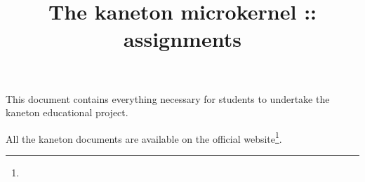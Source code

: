 %
%
%
%
%
%

%
%

%
%

\def\path{../..}

%
%



%
%


%
%

\title{The kaneton microkernel :: assignments \\
       \version
       \logo}

%
%



%
%

\maketitle

%
%

This document contains everything necessary for students to undertake the
kaneton educational project.

\-

All the kaneton documents are available on
  the official website\footnote{}.

%
%

\tableofcontents

%
%

\indentation{}

%
%















